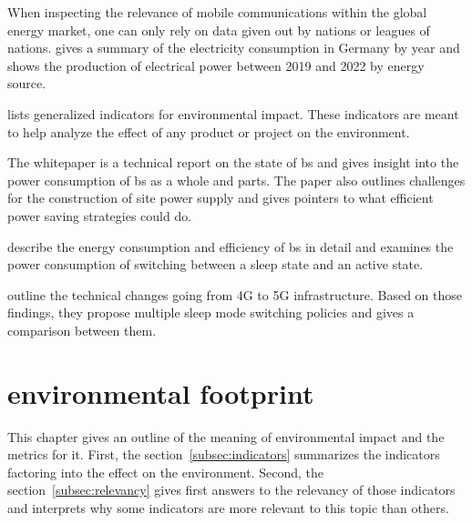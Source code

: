 \documentclass[11pt,a4paper]{article}
\begin{document}
When inspecting the relevance of mobile communications within the global energy market, one can only rely on data given out by nations or leagues of nations.
\citep{Stromverbrauch} gives a summary of the electricity consumption in Germany by year and \citep{Bruttostromerzeugung} shows the production of electrical power between 2019 and 2022 by energy source.

\citep{Umweltindikatoren} lists generalized indicators for environmental impact.
These indicators are meant to help analyze the effect of any product or project on the environment.

The whitepaper \citep{powerwhitepaper} is a technical report on the state of \acrshort{bs} and gives insight into the power consumption of \acrshort{bs} as a whole and parts.
The paper also outlines challenges for the construction of site power supply and gives pointers to what efficient power saving strategies could do.

\citep{5GEfficiencyOverview} describe the energy consumption and efficiency of \acrshort{bs} in detail and examines the power consumption of switching between a sleep state and an active state.

\citep{DynamicSleepModeControl} outline the technical changes going from 4G to 5G infrastructure.
Based on those findings, they propose multiple sleep mode switching policies and gives a comparison between them.

\section{environmental footprint}\label{sec:energyfootprint}
This chapter gives an outline of the meaning of environmental impact and the metrics for it.
First, the section~\ref{subsec:indicators} summarizes the indicators factoring into the effect on the environment.
Second, the section~\ref{subsec:relevancy} gives first answers to the relevancy of those indicators and interprets why some indicators are more relevant to this topic than others.
\end{document}
